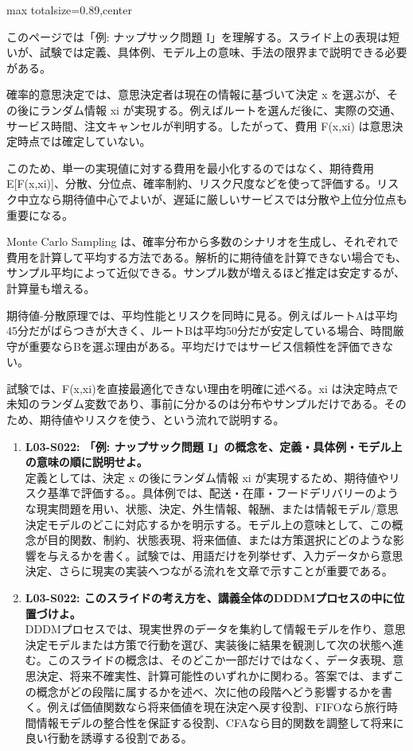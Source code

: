 \begin{minipage}[t]{0.58\textwidth}
\begin{adjustbox}{max totalsize={\textwidth}{0.89\textheight},center}
\begin{minipage}{\textwidth}\scriptsize
{}このページでは「例: ナップサック問題 I」を理解する。スライド上の表現は短いが、試験では定義、具体例、モデル上の意味、手法の限界まで説明できる必要がある。\par
確率的意思決定では、意思決定者は現在の情報に基づいて決定 x を選ぶが、その後にランダム情報 xi が実現する。例えばルートを選んだ後に、実際の交通、サービス時間、注文キャンセルが判明する。したがって、費用 F(x,xi) は意思決定時点では確定していない。\par
このため、単一の実現値に対する費用を最小化するのではなく、期待費用 E[F(x,xi)]、分散、分位点、確率制約、リスク尺度などを使って評価する。リスク中立なら期待値中心でよいが、遅延に厳しいサービスでは分散や上位分位点も重要になる。\par
Monte Carlo Sampling は、確率分布から多数のシナリオを生成し、それぞれで費用を計算して平均する方法である。解析的に期待値を計算できない場合でも、サンプル平均によって近似できる。サンプル数が増えるほど推定は安定するが、計算量も増える。\par
期待値-分散原理では、平均性能とリスクを同時に見る。例えばルートAは平均45分だがばらつきが大きく、ルートBは平均50分だが安定している場合、時間厳守が重要ならBを選ぶ理由がある。平均だけではサービス信頼性を評価できない。\par
試験では、F(x,xi)を直接最適化できない理由を明確に述べる。xi は決定時点で未知のランダム変数であり、事前に分かるのは分布やサンプルだけである。そのため、期待値やリスクを使う、という流れで説明する。\par{}\begin{enumerate}\item \textbf{L03-S022: 「例: ナップサック問題 I」の概念を、定義・具体例・モデル上の意味の順に説明せよ。}\\定義としては、決定 x の後にランダム情報 xi が実現するため、期待値やリスク基準で評価する。。具体例では、配送・在庫・フードデリバリーのような現実問題を用い、状態、決定、外生情報、報酬、または情報モデル/意思決定モデルのどこに対応するかを明示する。モデル上の意味として、この概念が目的関数、制約、状態表現、将来価値、または方策選択にどのような影響を与えるかを書く。試験では、用語だけを列挙せず、入力データから意思決定、さらに現実の実装へつながる流れを文章で示すことが重要である。\item \textbf{L03-S022: このスライドの考え方を、講義全体のDDDMプロセスの中に位置づけよ。}\\DDDMプロセスでは、現実世界のデータを集約して情報モデルを作り、意思決定モデルまたは方策で行動を選び、実装後に結果を観測して次の状態へ進む。このスライドの概念は、そのどこか一部だけではなく、データ表現、意思決定、将来不確実性、計算可能性のいずれかに関わる。答案では、まずこの概念がどの段階に属するかを述べ、次に他の段階へどう影響するかを書く。例えば価値関数なら将来価値を現在決定へ戻す役割、FIFOなら旅行時間情報モデルの整合性を保証する役割、CFAなら目的関数を調整して将来に良い行動を誘導する役割である。\end{enumerate}

\end{minipage}
\end{adjustbox}
\end{minipage}

